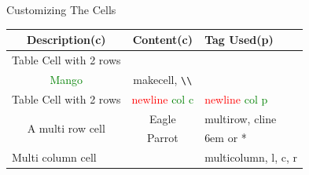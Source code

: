 
\begin{myTableStyle}{Customizing The Cells}
    \def\HA{\textbf{Description(c)}}    \def\HB{\textbf{Content(c)}}
    \def\HC{\textbf{Tag Used(p)}}
    \def\cellOneA{Table Cell with 2 rows}
    \def\cellOneB{\makecell[l]{\textcolor{red}{Apple} \\ \textcolor{green}{Mango}}}
    \def\cellOneC{makecell, \texttt{\textbackslash\textbackslash}}
    \def\cellTwoA{Table Cell with 2 rows}
    \def\cellTwoB{\textcolor{red}{newline} \newline \textcolor{green}{col c}}
    \def\cellTwoC{\textcolor{red}{newline} \newline \textcolor{green}{col p}}
    \def\cellThreeA{\multirow{2}{6em}{A multi row cell}}
    \def\cellThreeB{Eagle}  \def\cellThreeC{multirow, cline}
    \def\cellFourB{Parrot}  \def\cellFourC{6em or *}
    \def\cellFiveAB{\multicolumn{2}{|l|}{Multi column cell}}
    \def\cellFiveC{multicolumn, l, c, r}
    \begin{tabular}{|c|c|p{6cm}|} \hline
        \HA             & \HB           &   \HC             \\ \hline
        \cellOneA       & \cellOneB     &   \cellOneC       \\ \hline
        \cellTwoA       & \cellTwoB     &   \cellTwoC       \\ \hline
        \cellThreeA     & \cellThreeB   &   \cellThreeC     \\ \cline{2-3}
                        & \cellFourB    &   \cellFourC      \\ \hline
        \cellFiveAB                     &   \cellFiveC      \\ \hline
    \end{tabular}
\end{myTableStyle}